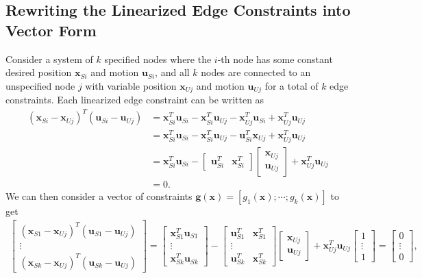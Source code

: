 \documentclass[%
preprint,
 amsmath,amssymb,
 aps,
]{revtex4-1}
\begin{document}
\subsection{Rewriting the Linearized Edge Constraints into Vector Form}
Consider a system of $k$ specified nodes where the $i$-th node has some constant desired position $\bm{x}_{Si}$ and motion $\bm{u}_{Si}$, and all $k$ nodes are connected to an unspecified node $j$ with variable position $\bm{x}_{Uj}$ and motion $\bm{u}_{Uj}$ for a total of $k$ edge constraints. Each linearized edge constraint can be written as
\begin{align*}
(\bm{x}_{Si} - \bm{x}_{Uj})^T (\bm{u}_{Si} - \bm{u}_{Uj})
&= \bm{x}_{Si}^T \bm{u}_{Si} - \bm{x}_{Si}^T \bm{u}_{Uj} - \bm{x}_{Uj}^T \bm{u}_{Si} + \bm{x}_{Uj}^T \bm{u}_{Uj}\\
&= \bm{x}_{Si}^T \bm{u}_{Si} - \bm{x}_{Si}^T \bm{u}_{Uj} - \bm{u}_{Si}^T \bm{x}_{Uj}  + \bm{x}_{Uj}^T \bm{u}_{Uj}\\
&= \bm{x}_{Si}^T \bm{u}_{Si} - 
\begin{bmatrix}
\bm{u}_{Si}^T & \bm{x}_{Si}^T
\end{bmatrix}
\begin{bmatrix}
\bm{x}_{Uj}\\
\bm{u}_{Uj}
\end{bmatrix}
+ \bm{x}_{Uj}^T \bm{u}_{Uj}\\
&= 0. 
\end{align*}
We can then consider a vector of constraints $\bm{g}(\bm{x}) = [g_1(\bm{x}); \dotsm; g_k(\bm{x})]$ to get
\begin{align*}
\begin{bmatrix}
(\bm{x}_{S1} - \bm{x}_{Uj})^T (\bm{u}_{S1} - \bm{u}_{Uj})\\
\vdots\\
(\bm{x}_{Sk} - \bm{x}_{Uj})^T (\bm{u}_{Sk} - \bm{u}_{Uj})
\end{bmatrix}
=
\begin{bmatrix}
\bm{x}_{S1}^T \bm{u}_{S1}\\
\vdots\\
\bm{x}_{Sk}^T \bm{u}_{Sk}
\end{bmatrix}
-
\begin{bmatrix}
\bm{u}_{S1}^T & \bm{x}_{S1}^T\\
\vdots\\
\bm{u}_{Sk}^T & \bm{x}_{Sk}^T
\end{bmatrix}
\begin{bmatrix}
\bm{x}_{Uj}\\
\bm{u}_{Uj}
\end{bmatrix}
+
\bm{x}_{Uj}^T \bm{u}_{Uj}
\begin{bmatrix}
1\\
\vdots\\
1
\end{bmatrix}
=
\begin{bmatrix}
0\\
\vdots\\
0
\end{bmatrix},
\end{align*}
\end{document}
